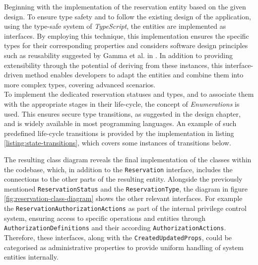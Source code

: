 Beginning with the implementation of the reservation entity based on the given design.
To ensure type safety and to follow the existing design of the application, using the type-safe system of \textit{TypeScript}, the entities are implemented as interfaces.
By employing this technique, this implementation ensures the specific types for their corresponding properties and considers software design principles such as reusability suggested by Gamma et al. in \cite[p.~47ff]{gamma_design_2015}. 
In addition to providing extensibility through the potential of deriving from these instances, this interface-driven method enables developers to adapt the entities and combine them into more complex types, covering advanced scenarios. \\
\noindent To implement the dedicated reservation statuses and types, and to associate them with the appropriate stages in their life-cycle, the concept of \textit{Enumerations} is used. This ensures secure type transitions, as suggested in the design chapter, and is widely available in most programming languages.
An example of such predefined life-cycle transitions is provided by the implementation in listing \ref{listing:state-transitions}, which covers some instances of transitions below. 



\noindent The resulting class diagram reveals the final implementation of the classes within the codebase, which, in addition to the \texttt{Reservation} interface, includes the connections to the other parts of the resulting entity.
Alongside the previously mentioned \texttt{ReservationStatus} and the \texttt{ReservationType}, the diagram in figure \ref{fig:reservation-class-diagram} shows the other relevant interfaces. 
For example the \texttt{ReservationAuthorizationActions} as part of the internal privilege control system, ensuring access to specific operations and entities through \texttt{AuthorizationDefinitions} and their according \texttt{AuthorizationActions}.
Therefore, these interfaces, along with the \texttt{CreatedUpdatedProps}, could be categorised as administrative properties to provide uniform handling of system entities internally.

